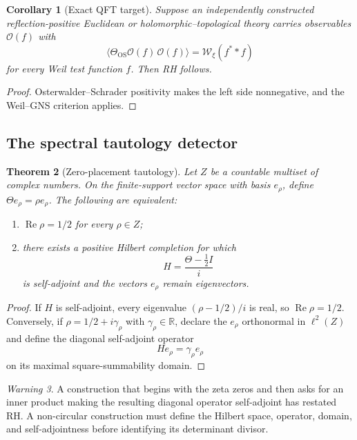 \documentclass[11pt]{article}
\newtheorem{theorem}{Theorem}[section]
\newtheorem{corollary}[theorem]{Corollary}
\theoremstyle{definition}
\theoremstyle{remark}
\newtheorem{warning}[theorem]{Warning}
\newcommand{\RR}{\mathbb R}
\newcommand{\WW}{\mathcal W}
\newcommand{\1}{\mathbf 1}
\begin{document}
\begin{corollary}[Exact QFT target]
Suppose an independently constructed reflection-positive Euclidean or holomorphic--topological theory carries observables $\mathcal O(f)$ with
\[
\big\langle \Theta_{\mathrm{OS}}\mathcal O(f)\,\mathcal O(f)\big\rangle
=
\WW_\xi(f^**f)
\]
for every Weil test function $f$.  Then RH follows.
\end{corollary}

\begin{proof}
Osterwalder--Schrader positivity makes the left side nonnegative, and the Weil--GNS criterion applies.
\end{proof}

\subsection{The spectral tautology detector}

\begin{theorem}[Zero-placement tautology]
Let $Z$ be a countable multiset of complex numbers.  On the finite-support vector space with basis $e_\rho$, define $\Theta e_\rho=\rho e_\rho$.  The following are equivalent:
\begin{enumerate}[label=(\roman*)]
\item $\operatorname{Re}\rho=1/2$ for every $\rho\in Z$;
\item there exists a positive Hilbert completion for which
\[
H=\frac{\Theta-\tfrac12 I}{i}
\]
is self-adjoint and the vectors $e_\rho$ remain eigenvectors.
\end{enumerate}
\end{theorem}

\begin{proof}
If $H$ is self-adjoint, every eigenvalue $(\rho-1/2)/i$ is real, so $\operatorname{Re}\rho=1/2$.  Conversely, if $\rho=1/2+i\gamma_\rho$ with $\gamma_\rho\in\RR$, declare the $e_\rho$ orthonormal in $\ell^2(Z)$ and define the diagonal self-adjoint operator
\[
He_\rho=\gamma_\rho e_\rho
\]
on its maximal square-summability domain.
\end{proof}

\begin{warning}
A construction that begins with the zeta zeros and then asks for an inner product making the resulting diagonal operator self-adjoint has restated RH.  A non-circular construction must define the Hilbert space, operator, domain, and self-adjointness before identifying its determinant divisor.
\end{warning}
\end{document}
